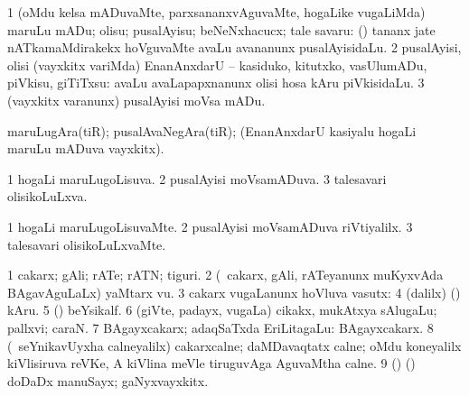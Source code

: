 {{{{{{\bentry
{} 
\gl{\sakirx}
\expl{}
\bmng
\bnum
\num{1} (oMdu kelsa mADuvaMte, parxsananxvAguvaMte, hogaLike \mo vugaLiMda) maruLu mADu; olisu; pusalAyisu; beNeNxhacucx; tale savaru:  (\AmA) tananx jate nATkamaMdirakekx hoVguvaMte avaLu avananunx pusalAyisidaLu. 
\num{2} pusalAyisi, olisi (vayxkitx \mo variMda) EnanAnxdarU -- kasiduko, kitutxko, vasUlumADu, piVkisu, giTiTxsu:  avaLu avaLapapxnanunx olisi hosa kAru piVkisidaLu. 
\num{3} (vayxkitx \mo varanunx) pusalAyisi moVsa mADu. 
\enum
\emng
\eentry

\bentry
{} 
\gl{\nA}
\expl{}
\bmng
maruLugAra(tiR); pusalAvaNegAra(tiR); (EnanAnxdarU kasiyalu hogaLi maruLu mADuva vayxkitx). 
\emng
\eentry

\bentry
{} 
\gl{\gu}
\expl{}
\bmng
\bnum
\num{1} hogaLi maruLugoLisuva. 
\num{2} pusalAyisi moVsamADuva. 
\num{3} talesavari olisikoLuLxva. 
\enum
\emng
\eentry

\bentry
{} 
\gl{\kirxvi}
\expl{}
\bmng
\bnum
\num{1} hogaLi maruLugoLisuvaMte. 
\num{2} pusalAyisi moVsamADuva riVtiyalilx. 
\num{3} talesavari olisikoLuLxvaMte. 
\enum
\emng
\eentry

\bentry
{} 
\gl{\nA}
\expl{}
\bmng
\bnum
\num{1} cakarx; gAli; rATe; rATN; tiguri. 
\num{2} (\kanmu\ cakarx, gAli, rATeyanunx muKyxvAda BAgavAguLaLx) yaMtarx \mo vu. 
\num{3} cakarx \mo vugaLanunx hoVluva vasutx:  
\num{4} (\bava dalilx) (\ashi) kAru. 
\num{5} (\ame) beYsikalf. 
\num{6} (giVte, padayx, \mo vugaLa) cikakx, mukAtxya sAlugaLu; pallxvi; caraN. 
\num{7} BAgayxcakarx; adaqSaTxda EriLitagaLu:  BAgayxcakarx. 
\num{8} (\sA\ seYnikavUyxha calneyalilx) cakarxcalne; daMDavaqtatx calne; oMdu koneyalilx kiVlisiruva reVKe, A kiVlina meVle tiruguvAga AguvaMtha calne. 
\num{9} (\ame) (\ashi) doDaDx manuSayx; gaNyxvayxkitx. 
\enum
\emng

}}}}}}
